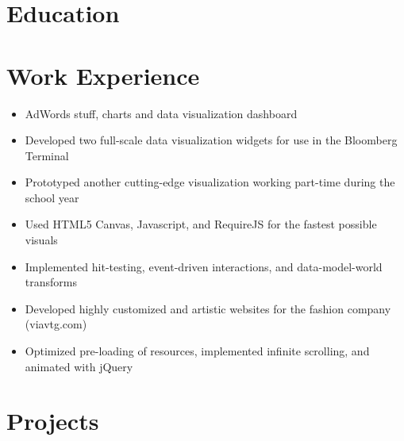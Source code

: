 \documentclass{zres}
\begin{document}
\begin{resume}

\section{Education}



\section{Work Experience}

\begin{itemize}[leftmargin=10pt]
  \item AdWords stuff, charts and data visualization dashboard
\end{itemize}

\begin{itemize}[leftmargin=10pt]
  \item Developed two full-scale data visualization widgets for use in the Bloomberg Terminal
  \item Prototyped another cutting-edge visualization working part-time during the school year
  \item Used HTML5 Canvas, Javascript, and RequireJS for the fastest possible visuals
  \item Implemented hit-testing, event-driven interactions, and data-model-world transforms
\end{itemize}

\begin{itemize}[leftmargin=10pt]
  \item Developed highly customized and artistic websites for the fashion company (viavtg.com)
  \item Optimized pre-loading of resources, implemented infinite scrolling, and animated with jQuery
\end{itemize}

\section{Projects}


\end{resume}
\end{document}

